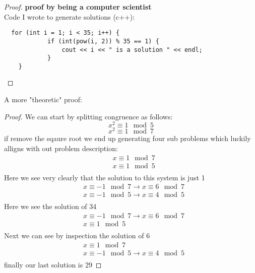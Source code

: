 \documentclass[11pt]{article}
\theoremstyle{definition}  %
\begin{document}
\begin{proof}
  \textbf{proof by being a computer scientist}\\

  Code I wrote to generate solutions (c++):
  \begin{lstlisting}
  for (int i = 1; i < 35; i++) {
  			if (int(pow(i, 2)) % 35 == 1) {
  				cout << i << " is a solution " << endl;
  			}
  	}
    \end{lstlisting}
\end{proof}
A more "theoretic" proof:
\begin{proof}
  We can start by splitting congruence as follows:
  \[
      x^2\equiv 1 \mod 5
  \]
  \[
      x^2\equiv 1 \mod 7
  \]
  if remove the sqaure root we end up generating four sub problems which luckily alligns with out problem description:
  \begin{align*}
    &x\equiv 1 \mod 7 \\
    &x\equiv 1 \mod 5\\
  \end{align*}
  Here we see very clearly that the solution to this system is just 1
  \begin{align*}
    &x\equiv -1 \mod 7 \rightarrow x\equiv 6 \mod7\\
    &x\equiv -1 \mod 5\rightarrow x\equiv 4 \mod5\\
  \end{align*}
  Here we see the solution of 34
  \begin{align*}
    &x\equiv -1 \mod 7 \rightarrow x\equiv 6 \mod7 \\
    &x\equiv 1 \mod 5\\
  \end{align*}
  Next we can see by inspection the solution of 6
  \begin{align*}
    &x\equiv 1 \mod 7 \\
    &x\equiv -1 \mod 5\rightarrow x\equiv 4 \mod5\\
  \end{align*}
  finally our last solution is 29
\end{proof}
\end{document}
